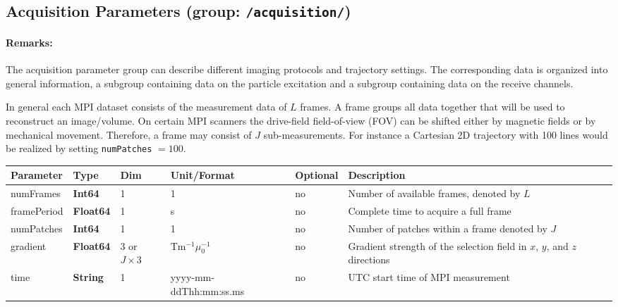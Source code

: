 \documentclass[landscape]{article} %
\newcommand{\inl}[1]{\lstinline[columns=fixed]{#1}}
\newcommand{\inltab}[1]{{\ttfamily\bfseries\color{blue}#1}}
\newcommand{\inlvar}[1]{{\ttfamily#1}}
\begin{document}
\subsection{Acquisition Parameters (group: \inl{/acquisition/})}

\begin{multicols}{2}

\paragraph{Remarks:} The acquisition parameter group can describe different imaging protocols and trajectory settings. The corresponding data is organized into general information, a subgroup containing data on the particle excitation and a subgroup containing data on the receive channels.

In general each MPI dataset consists of the measurement data of $L$ frames. A frame groups all data together that will be used to reconstruct an image/volume. On certain MPI scanners the drive-field field-of-view (FOV) can be shifted either by magnetic fields or by mechanical movement. Therefore, a frame may consist of $J$ sub-measurements. For instance a Cartesian 2D trajectory with 100 lines would be realized by setting \inl{numPatches} $ = 100$.

\end{multicols}

\noindent \begin{tabularx}{\columnwidth}{lllllX} 
\textbf{Parameter} & \textbf{Type} & \textbf{Dim} & \textbf{Unit/Format} & \textbf{Optional} & \textbf{Description} \\ \hline 
\inlvar{numFrames} & \inltab{Int64} & 1 & 1 & no & Number of available frames, denoted by $L$ \\ \hline
\inlvar{framePeriod} & \inltab{Float64} & 1 & s & no & Complete time to acquire a full frame \\ \hline
\inlvar{numPatches} & \inltab{Int64} & 1 & 1 & no & Number of patches within a frame denoted by $J$ \\ \hline 
\inlvar{gradient} & \inltab{Float64} & 3 or $J \times 3$ & Tm$^{-1}\mu_0^{-1}$ & no & Gradient strength of the selection field in $x$, $y$, and $z$ directions \\ \hline
\inlvar{time} & \inltab{String} & 1 & yyyy-mm-ddThh:mm:ss.ms & no & UTC start time of MPI measurement \\ \hline
\end{tabularx}
\end{document}
